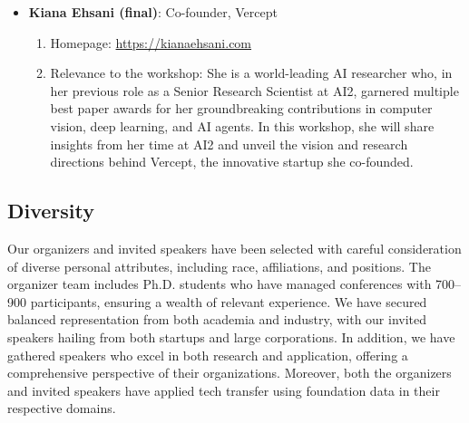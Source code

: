 \documentclass{article}
\def\c#1{\textcolor{gray}{#1}}
\begin{document}
\begin{itemize}
\begin{itemize}
    \end{itemize}
    \item {\bf Kiana Ehsani (final)}: Co-founder, Vercept
    \begin{enumerate}
        \item Homepage: \href{https://kianaehsani.com}{\url{https://kianaehsani.com}}
        \item Relevance to the workshop: She is a world-leading AI researcher who, in her previous role as a Senior Research Scientist at AI2, garnered multiple best paper awards for her groundbreaking contributions in computer vision, deep learning, and AI agents. In this workshop, she will share insights from her time at AI2 and unveil the vision and research directions behind Vercept, the innovative startup she co-founded.
    \end{enumerate}
\end{itemize}

\subsection{Diversity}

Our organizers and invited speakers have been selected with careful consideration of diverse personal attributes, including race, affiliations, and positions. The organizer team includes Ph.D. students who have managed conferences with 700–900 participants, ensuring a wealth of relevant experience. We have secured balanced representation from both academia and industry, with our invited speakers hailing from both startups and large corporations. In addition, we have gathered speakers who excel in both research and application, offering a comprehensive perspective of their organizations. Moreover, both the organizers and invited speakers have applied tech transfer using foundation data in their respective domains.
\end{document}

